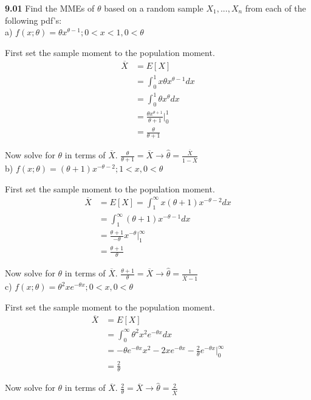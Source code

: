 
{\bf 9.01} Find the MMEs of $\theta$ based on a random sample $X_1,...,X_n$ from each of the following pdf's: \\


a) $f(x;\theta )=\theta x^{\theta -1};0<x<1,0<\theta$ 

First set the sample moment to the population moment.
\begin{align*}
	\overline{X}&=E[X] \\ 
	&=\int_0^1 x\theta x^{\theta -1} dx \\ 
	&=\int_0^1 \theta x^{\theta} dx \\ 
	&=\frac{\theta x^{\theta +1}}{\theta +1}\Big|_0^1 \\
	&=\frac{\theta}{\theta +1}
\end{align*}

Now solve for $\theta$ in terms of $\overline{X}$.
$\frac{\theta}{\theta +1}=\overline{X}\longrightarrow \hat{\theta}=\frac{\overline{X}}{1-\overline{X}}$
\\


b) $f(x;\theta)=(\theta +1)x^{-\theta -2};1<x,0<\theta$

First set the sample moment to the population moment.
\begin{align*}
	\overline{X}&=E[X]=\int_1^\infty x(\theta +1)x^{-\theta -2} dx\\
	&=\int_1^\infty (\theta +1)x^{-\theta -1}dx \\
	&=\frac{\theta +1}{-\theta}x^{-\theta}\Big|_1^\infty \\
	&=\frac{\theta +1}{\theta}
\end{align*}

Now solve for $\theta$ in terms of $\overline{X}$.
$\frac{\theta +1}{\theta}=\overline{X} \longrightarrow \hat{\theta}=\frac{1}{\overline{X}-1}$
\\


c) $f(x;\theta)=\theta^2xe^{-\theta x};0<x,0<\theta$

First set the sample moment to the population moment.
\begin{align*}
	\overline{X}&=E[X] \\
	&=\int_0^\infty \theta^2x^2e^{-\theta x}dx \\
	&=-\theta e^{-\theta x}x^2-2xe^{-\theta x}-\frac{2}{\theta}e^{-\theta x}\big|_0^\infty \\
	&=\frac{2}{\theta}
\end{align*}

Now solve for $\theta$ in terms of $\overline{X}$.
$\frac{2}{\theta}=\overline{X}\longrightarrow \hat{\theta}=\frac{2}{\overline{X}}$  \\


